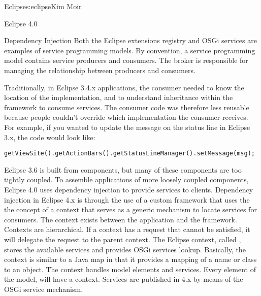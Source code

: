 \begin{aosachapter}{Eclipse}{s:eclipse}{Kim Moir}
\begin{aosasect1}{Eclipse 4.0}
\begin{aosasect2}{Dependency Injection}
Both the Eclipse extensions registry and OSGi services are examples of service
programming models. By convention, a service programming model contains service
producers and consumers. The broker is responsible for managing the
relationship between producers and consumers.


\pagebreak

Traditionally, in Eclipse 3.4.x applications, the consumer needed
to know the location of the implementation, and to
understand inheritance within the framework to
consume services. The consumer code was therefore less reusable
because people couldn't override which implementation the consumer
receives. For example, if you wanted to update the message on the
status line in Eclipse 3.x, the code would look like:

\begin{verbatim}
getViewSite().getActionBars().getStatusLineManager().setMessage(msg);
\end{verbatim}

Eclipse 3.6 is built from components, but many of these components are
too tightly coupled. To assemble applications of more loosely coupled
components, Eclipse 4.0 uses dependency injection to provide services
to clients. Dependency injection in Eclipse 4.x is through the use of
a custom framework that uses the the concept of a context that serves
as a generic mechanism to locate services for consumers.  The context
exists between the application and the framework. Contexts are
hierarchical. If a context has a request that cannot be satisfied,
it will delegate the request to the parent context. The Eclipse
context, called , stores the available services and
provides OSGi services lookup.  Basically, the context is similar to a
Java map in that it provides a mapping of a name or class to an
object.  The context handles model elements and services.  Every
element of the model, will have a context. Services are published in
4.x by means of the OSGi service mechanism.



\end{aosasect2}
\end{aosasect1}
\end{aosachapter}
